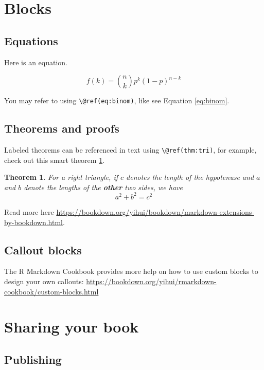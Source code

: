 \documentclass[
]{book}
\newtheorem{theorem}{Theorem}[chapter]
\theoremstyle{definition}
\theoremstyle{definition}
\theoremstyle{definition}
\theoremstyle{definition}
\theoremstyle{remark}
\begin{document}
\section{Blocks}\label{blocks}

\subsection{Equations}\label{equations}

Here is an equation.

\begin{equation} 
  f\left(k\right) = \binom{n}{k} p^k\left(1-p\right)^{n-k}
  \label{eq:binom}
\end{equation}

You may refer to using \texttt{\textbackslash{}@ref(eq:binom)}, like see Equation \eqref{eq:binom}.

\subsection{Theorems and proofs}\label{theorems-and-proofs}

Labeled theorems can be referenced in text using \texttt{\textbackslash{}@ref(thm:tri)}, for example, check out this smart theorem \ref{thm:tri}.

\begin{theorem}
\protect\hypertarget{thm:tri}{}\label{thm:tri}For a right triangle, if \(c\) denotes the \emph{length} of the hypotenuse
and \(a\) and \(b\) denote the lengths of the \textbf{other} two sides, we have
\[a^2 + b^2 = c^2\]
\end{theorem}

Read more here \url{https://bookdown.org/yihui/bookdown/markdown-extensions-by-bookdown.html}.

\subsection{Callout blocks}\label{callout-blocks}

The R Markdown Cookbook provides more help on how to use custom blocks to design your own callouts: \url{https://bookdown.org/yihui/rmarkdown-cookbook/custom-blocks.html}

\section{Sharing your book}\label{sharing-your-book}

\subsection{Publishing}\label{publishing}
\end{document}
